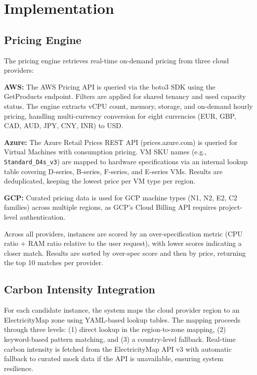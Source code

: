 \documentclass[conference]{IEEEtran}
\begin{document}
\section{Implementation}

\subsection{Pricing Engine}

The pricing engine retrieves real-time on-demand pricing from three cloud providers:

\textbf{AWS:} The AWS Pricing API is queried via the boto3 SDK using the GetProducts endpoint. Filters are applied for shared tenancy and used capacity status. The engine extracts vCPU count, memory, storage, and on-demand hourly pricing, handling multi-currency conversion for eight currencies (EUR, GBP, CAD, AUD, JPY, CNY, INR) to USD.

\textbf{Azure:} The Azure Retail Prices REST API (prices.azure.com) is queried for Virtual Machines with consumption pricing. VM SKU names (e.g., \texttt{Standard\_D4s\_v3}) are mapped to hardware specifications via an internal lookup table covering D-series, B-series, F-series, and E-series VMs. Results are deduplicated, keeping the lowest price per VM type per region.

\textbf{GCP:} Curated pricing data is used for GCP machine types (N1, N2, E2, C2 families) across multiple regions, as GCP's Cloud Billing API requires project-level authentication.

Across all providers, instances are scored by an over-specification metric (CPU ratio + RAM ratio relative to the user request), with lower scores indicating a closer match. Results are sorted by over-spec score and then by price, returning the top 10 matches per provider.

\subsection{Carbon Intensity Integration}

For each candidate instance, the system maps the cloud provider region to an ElectricityMap zone using YAML-based lookup tables. The mapping proceeds through three levels: (1) direct lookup in the region-to-zone mapping, (2) keyword-based pattern matching, and (3) a country-level fallback. Real-time carbon intensity is fetched from the ElectricityMap API v3 with automatic fallback to curated mock data if the API is unavailable, ensuring system resilience.
\end{document}
